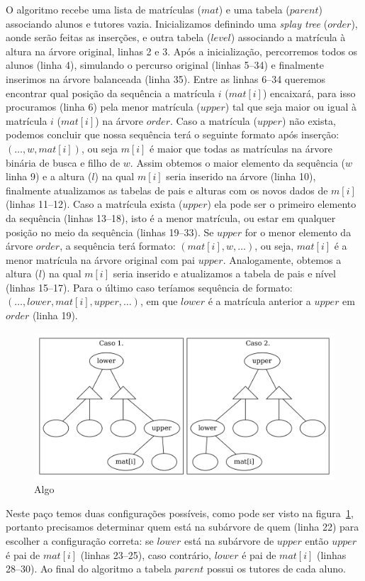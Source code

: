 O algoritmo recebe uma lista de matrículas ($mat$) e uma tabela ($parent$) associando alunos e
tutores vazia. Inicializamos definindo uma \textit{splay tree} ($order$), aonde
serão feitas as inserções, e outra tabela ($level$) associando a matrícula à
altura na árvore original, linhas 2 e 3. Após a inicialização, percorremos todos
os alunos (linha 4), simulando o percurso original (linhas 5--34) e finalmente
inserimos na árvore balanceada (linha 35). Entre as linhas 6--34 queremos
encontrar qual posição da sequência a matrícula $i$ ($mat[i]$) encaixará,
para isso procuramos (linha 6) pela menor matrícula ($upper$) tal que seja maior
ou igual à matrícula $i$ ($mat[i]$) na árvore $order$. Caso a matrícula ($upper$) não
exista, podemos concluir que nossa sequência terá o seguinte formato após inserção: $(\ldots,
w,mat[i])$, ou seja $m[i]$ é maior que todas as matrículas na árvore binária de
busca e filho de $w$. Assim obtemos o maior elemento da sequência ($w$ linha
9) e a altura ($l$) na qual $m[i]$ seria inserido na árvore (linha 10),
finalmente atualizamos as tabelas de pais e alturas com os novos dados de $m[i]$
(linhas 11--12). Caso a matrícula exista ($upper$) ela pode ser o primeiro
elemento da sequência (linhas 13--18), isto é a menor matrícula, ou estar em qualquer posição no
meio da sequência (linhas 19--33). Se $upper$ for o menor elemento da árvore
$order$, a sequência terá formato: $(mat[i], w, \ldots)$, ou seja, $mat[i]$ é a
menor matrícula na árvore original com pai $upper$. Analogamente, obtemos a altura ($l$) na qual
$m[i]$ seria inserido e atualizamos a tabela de pais e nível (linhas 15--17).
Para o último caso teríamos sequência de formato: $(\ldots, lower, mat[i],
upper, \ldots)$, em que $lower$ é a matrícula anterior a $upper$ em $order$
(linha 19).
\begin{figure}[!htb]
  \centering
  \includegraphics[width=0.7\linewidth]{lxu.png}
  \caption{Algo}
  \label{fig:lxu}
\end{figure}
Neste paço temos duas configurações possíveis, como pode ser visto
na figura~\ref{fig:lxu}, portanto precisamos determinar quem está na subárvore
de quem (linha 22) para escolher a configuração correta: se $lower$ está na
subárvore de $upper$ então $upper$ é pai de $mat[i]$ (linhas 23--25), caso
contrário, $lower$ é pai de $mat[i]$ (linhas 28--30). Ao final do algoritmo a
tabela $parent$ possui os tutores de cada aluno.


